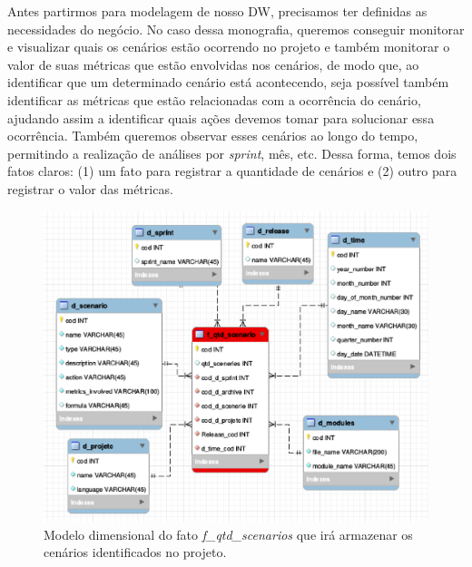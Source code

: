 %
Antes partirmos para modelagem de nosso DW,  precisamos ter definidas as necessidades do negócio. No caso dessa monografia, queremos conseguir monitorar e visualizar quais os cenários estão ocorrendo no projeto e também monitorar o valor de suas métricas que estão envolvidas nos cenários, de modo que, ao identificar que um determinado cenário está acontecendo, seja possível também identificar as métricas que estão relacionadas com a ocorrência do cenário, ajudando assim a identificar quais ações devemos tomar para solucionar essa ocorrência. Também queremos observar esses cenários ao longo do tempo, permitindo a realização de análises por \emph{sprint}, mês, etc. Dessa forma, temos dois fatos claros: (1) um fato para registrar a quantidade de cenários e (2) outro para registrar o valor das métricas.

 \begin{figure}[H]
 	\centering
 		\includegraphics[scale=0.5]{figuras/dw-f-scenarios}
 		\caption{Modelo dimensional do fato \emph{f\_qtd\_scenarios} que irá armazenar os cenários identificados no projeto.}
 		\label{dw-model1}
 \end{figure}

 

